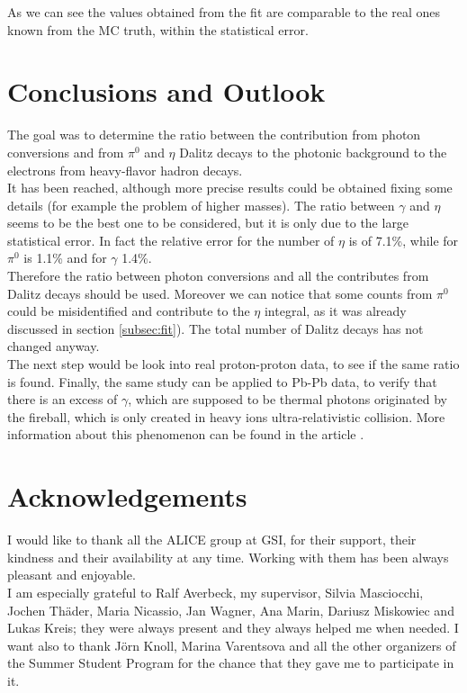 \documentclass[a4paper,twocolumn,gsifonts,twoside]{gsipaper}
\begin{document}
As we can see the values obtained from the fit are comparable to the real ones known from the MC truth, within the statistical error.

\section{Conclusions and Outlook}
The goal was to determine the ratio between the contribution from photon conversions and from $\pi^{0}$ and $\eta$ Dalitz decays 
to the photonic background to the electrons from heavy-flavor hadron decays.\\ 
It has been reached, although more precise results could be obtained fixing some details (for example the problem of higher masses).
The ratio between $\gamma$ and $\eta$ seems to be the best one to be considered, but it is only due to the large statistical error.
In fact the relative error for the number of $\eta$ is of 7.1\%, while for $\pi^{0}$ is 1.1\% and for $\gamma$ 1.4\%.\\ 
Therefore the ratio between photon conversions and all the contributes from Dalitz decays should be used.
Moreover we can notice that some counts from $\pi^{0}$ could be misidentified and contribute to the $\eta$ integral, as it was 
already discussed in section \ref{subsec:fit}). The total number of Dalitz decays has not changed anyway.\\

The next step would be look into real proton-proton data, to see if the same ratio is found.
Finally, the same study can be applied to Pb-Pb data, to verify that there is an excess of $\gamma$, which are supposed to be 
thermal photons originated by the fireball, which is only created in heavy ions ultra-relativistic collision.  
More information about this phenomenon can be found in the article \cite{Masciocchi:2011fu}.

\section*{Acknowledgements}
I would like to thank all the ALICE group at GSI, for their support, their kindness and their availability at any time.
Working with them has been always pleasant and enjoyable.\\
I am especially grateful to Ralf Averbeck, my supervisor, Silvia Masciocchi, Jochen Th\"{a}der, Maria Nicassio, Jan Wagner, Ana Marin,
Dariusz Miskowiec and Lukas Kreis; they were always present and they always helped me when needed.
I want also to thank J\"{o}rn Knoll, Marina Varentsova and all the other organizers of the Summer Student Program for the chance 
that they gave me to participate in it. 
\end{document}
